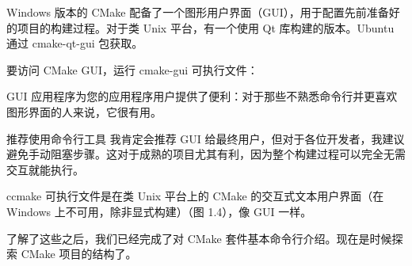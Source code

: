 
Windows 版本的 CMake 配备了一个图形用户界面（GUI），用于配置先前准备好的项目的构建过程。对于类 Unix 平台，有一个使用 Qt 库构建的版本。Ubuntu 通过 cmake-qt-gui 包获取。

要访问 CMake GUI，运行 cmake-gui 可执行文件：


GUI 应用程序为您的应用程序用户提供了便利：对于那些不熟悉命令行并更喜欢图形界面的人来说，它很有用。

\begin{myNotic}{推荐使用命令行工具}
我肯定会推荐 GUI 给最终用户，但对于各位开发者，我建议避免手动阻塞步骤。这对于成熟的项目尤其有利，因为整个构建过程可以完全无需交互就能执行。
\end{myNotic}


ccmake 可执行文件是在类 Unix 平台上的 CMake 的交互式文本用户界面（在 Windows 上不可用，除非显式构建）（图 1.4），像 GUI 一样。


了解了这些之后，我们已经完成了对 CMake 套件基本命令行介绍。现在是时候探索 CMake 项目的结构了。

















